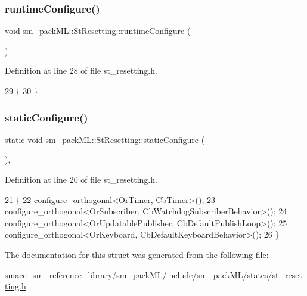 \subsubsection{\texorpdfstring{runtime\+Configure()}{runtimeConfigure()}}
{\footnotesize\ttfamily void sm\+\_\+pack\+M\+L\+::\+St\+Resetting\+::runtime\+Configure (\begin{DoxyParamCaption}{ }\end{DoxyParamCaption})\hspace{0.3cm}{\ttfamily [inline]}}



Definition at line 28 of file st\+\_\+resetting.\+h.


\begin{DoxyCode}
29     \{
30     \}
\end{DoxyCode}
\mbox{\label{structsm__packML_1_1StResetting_a4c1f24d4cab96fd914b31e41c21ab98e}} 
\subsubsection{\texorpdfstring{static\+Configure()}{staticConfigure()}}
{\footnotesize\ttfamily static void sm\+\_\+pack\+M\+L\+::\+St\+Resetting\+::static\+Configure (\begin{DoxyParamCaption}{ }\end{DoxyParamCaption})\hspace{0.3cm}{\ttfamily [inline]}, {\ttfamily [static]}}



Definition at line 20 of file st\+\_\+resetting.\+h.


\begin{DoxyCode}
21     \{
22         configure\_orthogonal<OrTimer, CbTimer>();   
23         configure\_orthogonal<OrSubscriber, CbWatchdogSubscriberBehavior>();
24         configure\_orthogonal<OrUpdatablePublisher, CbDefaultPublishLoop>();
25         configure\_orthogonal<OrKeyboard, CbDefaultKeyboardBehavior>();
26     \}
\end{DoxyCode}


The documentation for this struct was generated from the following file\+:\begin{DoxyCompactItemize}
\item 
smacc\+\_\+sm\+\_\+reference\+\_\+library/sm\+\_\+pack\+M\+L/include/sm\+\_\+pack\+M\+L/states/\hyperlink{st__resetting_8h}{st\+\_\+resetting.\+h}\end{DoxyCompactItemize}
